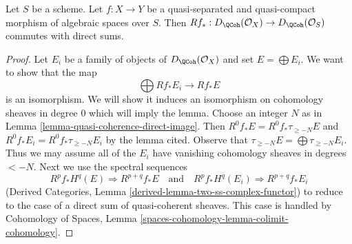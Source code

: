 \begin{lemma}
\label{lemma-quasi-coherence-pushforward-direct-sums}
Let $S$ be a scheme. Let $f : X \to Y$ be a quasi-separated and
quasi-compact morphism of algebraic spaces over $S$. Then
$Rf_* : D_\QCoh(\mathcal{O}_X) \to D_\QCoh(\mathcal{O}_S)$
commutes with direct sums.
\end{lemma}

\begin{proof}
Let $E_i$ be a family of objects of $D_\QCoh(\mathcal{O}_X)$
and set $E = \bigoplus E_i$. We want to show that the map
$$
\bigoplus Rf_*E_i \longrightarrow Rf_*E
$$
is an isomorphism. We will show it induces an isomorphism on
cohomology sheaves in degree $0$ which will imply the lemma.
Choose an integer $N$ as in Lemma \ref{lemma-quasi-coherence-direct-image}.
Then $R^0f_*E = R^0f_*\tau_{\geq -N}E$ and
$R^0f_*E_i = R^0f_*\tau_{\geq -N}E_i$ by the lemma cited. Observe that
$\tau_{\geq -N}E = \bigoplus \tau_{\geq -N}E_i$.
Thus we may assume all of the $E_i$ have vanishing cohomology
sheaves in degrees $< -N$. Next we use the spectral sequences
$$
R^pf_*H^q(E) \Rightarrow R^{p + q}f_*E
\quad\text{and}\quad
R^pf_*H^q(E_i) \Rightarrow R^{p + q}f_*E_i
$$
(Derived Categories, Lemma \ref{derived-lemma-two-ss-complex-functor})
to reduce to the case of a direct sum of quasi-coherent sheaves.
This case is handled by
Cohomology of Spaces, Lemma \ref{spaces-cohomology-lemma-colimit-cohomology}.
\end{proof}

